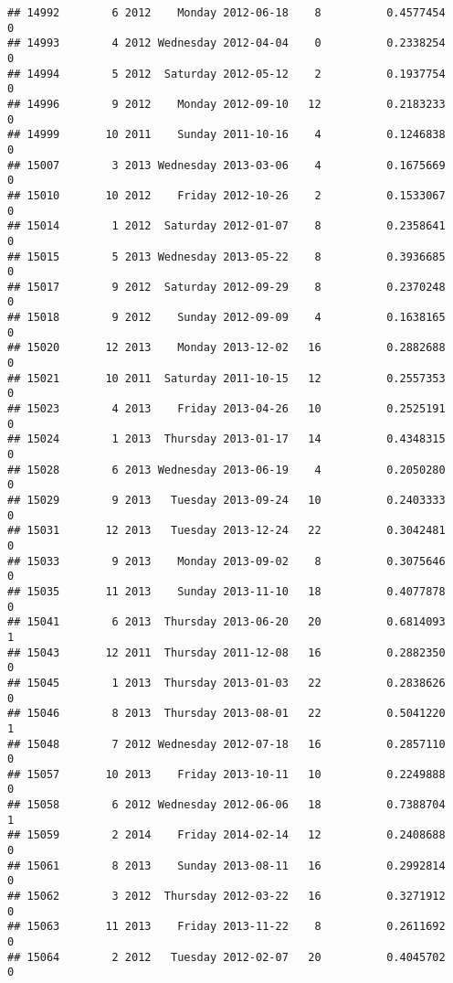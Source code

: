 \documentclass[
]{article}
\begin{document}
\begin{verbatim}
## 14992        6 2012    Monday 2012-06-18    8          0.4577454             0
## 14993        4 2012 Wednesday 2012-04-04    0          0.2338254             0
## 14994        5 2012  Saturday 2012-05-12    2          0.1937754             0
## 14996        9 2012    Monday 2012-09-10   12          0.2183233             0
## 14999       10 2011    Sunday 2011-10-16    4          0.1246838             0
## 15007        3 2013 Wednesday 2013-03-06    4          0.1675669             0
## 15010       10 2012    Friday 2012-10-26    2          0.1533067             0
## 15014        1 2012  Saturday 2012-01-07    8          0.2358641             0
## 15015        5 2013 Wednesday 2013-05-22    8          0.3936685             0
## 15017        9 2012  Saturday 2012-09-29    8          0.2370248             0
## 15018        9 2012    Sunday 2012-09-09    4          0.1638165             0
## 15020       12 2013    Monday 2013-12-02   16          0.2882688             0
## 15021       10 2011  Saturday 2011-10-15   12          0.2557353             0
## 15023        4 2013    Friday 2013-04-26   10          0.2525191             0
## 15024        1 2013  Thursday 2013-01-17   14          0.4348315             0
## 15028        6 2013 Wednesday 2013-06-19    4          0.2050280             0
## 15029        9 2013   Tuesday 2013-09-24   10          0.2403333             0
## 15031       12 2013   Tuesday 2013-12-24   22          0.3042481             0
## 15033        9 2013    Monday 2013-09-02    8          0.3075646             0
## 15035       11 2013    Sunday 2013-11-10   18          0.4077878             0
## 15041        6 2013  Thursday 2013-06-20   20          0.6814093             1
## 15043       12 2011  Thursday 2011-12-08   16          0.2882350             0
## 15045        1 2013  Thursday 2013-01-03   22          0.2838626             0
## 15046        8 2013  Thursday 2013-08-01   22          0.5041220             1
## 15048        7 2012 Wednesday 2012-07-18   16          0.2857110             0
## 15057       10 2013    Friday 2013-10-11   10          0.2249888             0
## 15058        6 2012 Wednesday 2012-06-06   18          0.7388704             1
## 15059        2 2014    Friday 2014-02-14   12          0.2408688             0
## 15061        8 2013    Sunday 2013-08-11   16          0.2992814             0
## 15062        3 2012  Thursday 2012-03-22   16          0.3271912             0
## 15063       11 2013    Friday 2013-11-22    8          0.2611692             0
## 15064        2 2012   Tuesday 2012-02-07   20          0.4045702             0

\end{verbatim}
\end{document}
